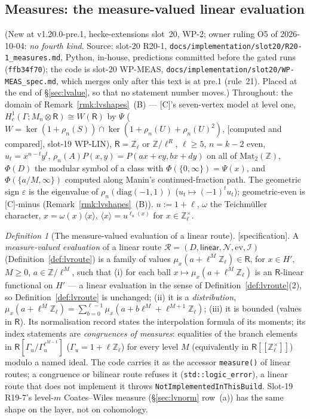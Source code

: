 \documentclass[11pt]{article}
\theoremstyle{remark}
\newtheorem{definition}[theorem]{Definition}
\newcommand{\Z}{\mathbb{Z}}
\newcommand{\Ga}{\Gamma}
\newcommand{\Mn}{M_n}
\newcommand{\CMPD}{\textsf{[computed and compared]}}   %
\newcommand{\SPEC}{\textsf{[specification]}}           %
\begin{document}
\subsection{Measures: the measure-valued \textsf{linear} evaluation}\label{sec:lvmeasure}
(New at v1.20.0-pre.1, hecke-extensions slot~20, WP-2; owner ruling O5 of 2026-10-04: \emph{no fourth kind}. Source: slot-20 R20-1,
\texttt{docs/implementation/slot20/R20-1\_measures.md}, Python, in-house, predictions committed before the gated runs (\texttt{ffb34f70}); the code is slot-20 WP-MEAS,
\texttt{docs/implementation/slot20/WP-MEAS\_spec.md}, which merges only after this text is at pre.1 (rule~21). Placed at the end of \S\ref{sec:lvalue}, so that no
statement number moves.) Throughout: the domain of Remark~\ref{rmk:lvshapes}~(B) --- [C]'s seven-vertex model at level one, $H^{1}_c(\Ga;\Mn\otimes\mathsf R)\cong W(\mathsf R)$
by $\Psi$ ($W=\ker(1+\rho_n(S))\cap\ker(1+\rho_n(U)+\rho_n(U)^{2})$, \CMPD, slot-19 WP-LIN), $\mathsf R=\Z_\ell$ or $\Z/\ell^{R}$, $\ell\ge5$, $n=k-2$ even, $u_t=x^{n-t}y^{t}$,
$\rho_n(A)P(x,y)=P(ax+cy,bx+dy)$ on all of $\mathrm{Mat}_2(\Z)$, $\Phi(D)$ the modular symbol of a class with $\Phi(\{0,\infty\})=\Psi(x)$, and $\Phi(\{a/M,\infty\})$ computed along
Manin's continued-fraction path. The geometric sign $\varepsilon$ is the eigenvalue of $\rho_n(\mathrm{diag}(-1,1))$ ($u_t\mapsto(-1)^{t}u_t$); geometric-even is [C]-minus
(Remark~\ref{rmk:lvshapes}~(B)). $u:=1+\ell$, $\omega$ the Teichm\"uller character, $x=\omega(x)\langle x\rangle$, $\langle x\rangle=u^{\ell_u(x)}$ for $x\in\Z_\ell^{\times}$.

\begin{definition}[The measure-valued evaluation of a \textsf{linear} route]\label{def:lvmeasure}
\SPEC. A \emph{measure-valued evaluation} of a \textsf{linear} route $\mathcal R=(D,\textsf{linear},\mathcal N,\mathrm{ev},\mathcal I)$ (Definition~\ref{def:lvroute}) is a family of values
$\mu_x(a+\ell^{M}\Z_\ell)\in\mathsf R$, for $x\in H'$, $M\ge0$, $a\in\Z/\ell^{M}$, such that (i) for each ball $x\mapsto\mu_x(a+\ell^{M}\Z_\ell)$ is an $\mathsf R$-linear functional on
$H'$ --- a \textsf{linear} evaluation in the sense of Definition~\ref{def:lvroute}(2), so Definition~\ref{def:lvroute} is unchanged; (ii) it is a \emph{distribution},
$\mu_x(a+\ell^{M}\Z_\ell)=\sum_{b=0}^{\ell-1}\mu_x(a+b\ell^{M}+\ell^{M+1}\Z_\ell)$; (iii) it is bounded (values in $\mathsf R$). Its normalisation record states the
interpolation formula of its moments; its index statements are \emph{congruences of measures}: equalities of the branch elements in $\mathsf R[\Ga_u/\Ga_u^{\ell^{M-1}}]$
($\Ga_u=1+\ell\Z_\ell$) for every level $M$ (equivalently in $\mathsf R[\![\Z_\ell^{\times}]\!]$) modulo a named ideal. The code carries it as the accessor \texttt{measure()} of
\textsf{linear} routes; a \textsf{congruence} or \textsf{bilinear} route refuses it (\texttt{std::logic\_error}), a \textsf{linear} route that does not implement it throws
\texttt{NotImplementedInThisBuild}. Slot-19 R19-7's level-$m$ Coates--Wiles measure (\S\ref{sec:lvnorm} row~(a)) has the same shape on the layer, not on cohomology.
\end{definition}
\end{document}
